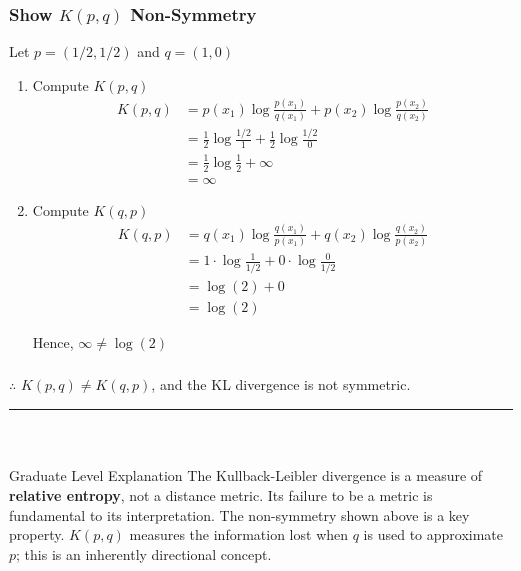 \documentclass{article}
\begin{document}
\subsubsection*{Show $K(p, q)$ Non-Symmetry}
\begin{flushleft}
  Let $p = (1/2, 1/2)$ and $q = (1, 0)$
\end{flushleft}
\begin{enumerate}
  \item Compute $K(p,q)$
  \begin{align*}
    K(p, q) &= p(x_1) \log\frac{p(x_1)}{q(x_1)} + p(x_2) \log\frac{p(x_2)}{q(x_2)} \\
    &= \frac{1}{2} \log\frac{1/2}{1} + \frac{1}{2} \log\frac{1/2}{0} \\
    &= \frac{1}{2} \log\frac{1}{2} + \infty \\
    &= \infty
\end{align*}
  \item Compute $K(q,p)$
  \begin{align*}
    K(q, p) &= q(x_1) \log\frac{q(x_1)}{p(x_1)} + q(x_2) \log\frac{q(x_2)}{p(x_2)} \\
    &= 1 \cdot \log\frac{1}{1/2} + 0 \cdot \log\frac{0}{1/2} \\
    &= \log(2) + 0 \\
    &= \log(2)
\end{align*}
\begin{flushleft}
  Hence, $\infty \neq \log(2)$
\end{flushleft}
\end{enumerate}

\subsubsection*{\normalfont}{$\therefore$ $K(p, q) \neq K(q, p)$, and the KL divergence is not symmetric.}

\noindent\rule{\textwidth}{0.4pt}\\

\newpage

\subsubsection*{\normalfont}{Graduate Level Explanation}
The Kullback-Leibler divergence is a measure of \textbf{relative entropy}, not a distance metric. Its failure to be a metric is fundamental to its interpretation. The non-symmetry shown above is a key property. $K(p, q)$ measures the information lost when $q$ is used to approximate $p$; this is an inherently directional concept.
\end{document}
